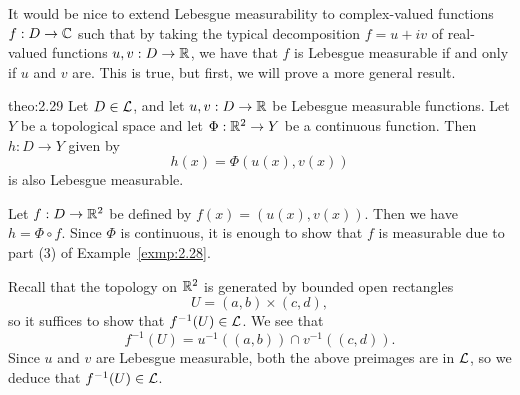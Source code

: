 It would be nice to extend Lebesgue measurability to complex-valued functions 
$f : D \to \mathbb{C}$ such that by taking the typical decomposition 
$f = u + iv$ of real-valued functions $u, v : D \to \mathbb{R}$, we have that $f$ 
is Lebesgue measurable if and only if $u$ and $v$ are. This is true, 
but first, we will prove a more general result. 

\begin{theo}{theo:2.29}
    Let $D \in {\cal L}$, and let $u, v : D \to \mathbb{R}$ be Lebesgue measurable 
    functions. Let $Y$ be a topological space and let $\Phi : \mathbb{R}^2 
    \to Y$ be a continuous function. Then $h : D \to Y$ given by 
    \[ h(x) = \Phi(u(x), v(x)) \] 
    is also Lebesgue measurable. 
\end{theo}
\begin{pf}
    Let $f : D \to \mathbb{R}^2$ be defined by $f(x) = (u(x), v(x))$. Then we have 
    $h = \Phi \circ f$. Since $\Phi$ is continuous, it is enough to 
    show that $f$ is measurable due to part (3) of Example~\ref{exmp:2.28}.
    
    Recall that the topology on $\mathbb{R}^2$ is generated by bounded open rectangles 
    \[ U = (a, b) \times (c, d), \] 
    so it suffices to show that $f^{-1}(U) \in {\cal L}$. We see that 
    \[ f^{-1}(U) = u^{-1}((a, b)) \cap v^{-1}((c, d)). \] 
    Since $u$ and $v$ are Lebesgue measurable, both the above preimages 
    are in ${\cal L}$, so we deduce that $f^{-1}(U) \in {\cal L}$. 
\end{pf}

